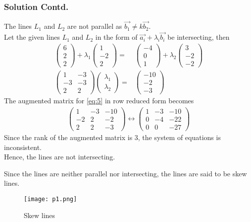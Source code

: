 \documentclass{beamer}
\newcommand{\myvec}[1]{\ensuremath{\begin{pmatrix}#1\end{pmatrix}}}
\begin{document}
\begin{frame}
\frametitle{Solution Contd.}
The lines $L_{1}$ and $L_{2}$ are not parallel as $\Vec{b_{1}}\neq k\Vec{b_{2}}$.\\
Let the given lines $L_{1}$ and $L_{2}$ in the form of $\Vec{a_{i}}+\lambda_{i}\Vec{b_{i}}$ be intersecting, then
\begin{align}
    \label{eq:4}
    \myvec{6 \\ 2\\ 2 } +\lambda_{1}\myvec{1 \\ -2 \\ 2} ={}& \myvec{-4 \\ 0\\ 1} + \lambda_{2}\myvec{3 \\ -2 \\ -2} \\
    \label{eq:5}
    \myvec{1 & -3\\ -3 &-3 \\ 2 & 2}\myvec{\lambda_{1}\\ \lambda_{2}}={}&\myvec{-10 \\ -2\\ -3 }
\end{align}
The augmented matrix for \eqref{eq:5} in row reduced form becomes
\begin{align}
\label{eq:6}
\myvec{1 & -3 & -10\\ -2 &2 & -2\\ 2 & 2 & -3} \longleftrightarrow \myvec{1 & -3 & -10\\ 0 & -4 & -22\\ 0 & 0 & -27}
\end{align}
Since the rank of the augmented matrix is 3, the system of equations is inconsistent.\\
Hence, the lines are not intersecting.
\end{frame}
\begin{frame}
Since the lines are neither parallel nor intersecting, the lines are said to be skew lines.
\begin{figure}[htp]
    \centering
    \texttt{[image: p1.png]}
    \caption{Skew lines}
    \label{fig:my_label}
\end{figure}
\end{frame}
\end{document}
